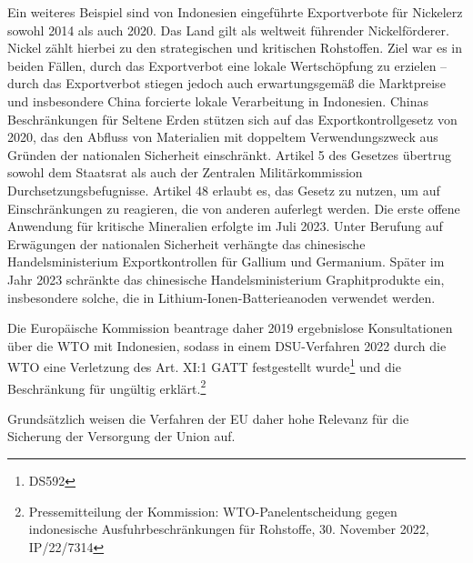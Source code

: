 \documentclass[12pt,a4paper,oneside]{book} %
\begin{document}
Ein weiteres Beispiel sind von Indonesien eingeführte Exportverbote für Nickelerz sowohl 2014 als auch 2020. Das Land gilt als weltweit führender Nickelförderer.\autocite[52]{DERA Rohstoffinformation Indonesien, } Nickel zählt hierbei zu den strategischen und kritischen Rohstoffen. Ziel war es in beiden Fällen, durch das Exportverbot eine lokale Wertschöpfung zu erzielen -- durch das Exportverbot stiegen jedoch auch erwartungsgemäß die Marktpreise und insbesondere China forcierte lokale Verarbeitung in Indonesien.\autocite{DERA} Chinas Beschränkungen für Seltene Erden stützen sich auf das Exportkontrollgesetz von 2020, das den Abfluss von Materialien mit doppeltem Verwendungszweck aus Gründen der nationalen Sicherheit einschränkt. Artikel 5 des Gesetzes übertrug sowohl dem Staatsrat als auch der Zentralen Militärkommission Durchsetzungsbefugnisse. Artikel 48 erlaubt es, das Gesetz zu nutzen, um auf Einschränkungen zu reagieren, die von anderen auferlegt werden. Die erste offene Anwendung für kritische Mineralien erfolgte im Juli 2023. Unter Berufung auf Erwägungen der nationalen Sicherheit verhängte das chinesische Handelsministerium Exportkontrollen für Gallium und Germanium. Später im Jahr 2023 schränkte das chinesische Handelsministerium Graphitprodukte ein, insbesondere solche, die in Lithium-Ionen-Batterieanoden verwendet werden. 

Die Europäische Kommission beantrage daher 2019 ergebnislose Konsultationen über die WTO mit Indonesien, sodass in einem DSU-Verfahren 2022 durch die WTO eine Verletzung des Art. XI:1 GATT festgestellt wurde\footnote{DS592} und die Beschränkung für ungültig erklärt.\footnote{Pressemitteilung der Kommission: WTO-Panelentscheidung gegen indonesische Ausfuhrbeschränkungen für Rohstoffe, 30. November 2022, IP/22/7314}

Grundsätzlich weisen die Verfahren der EU daher hohe Relevanz für die Sicherung der Versorgung der Union auf.
\end{document}
